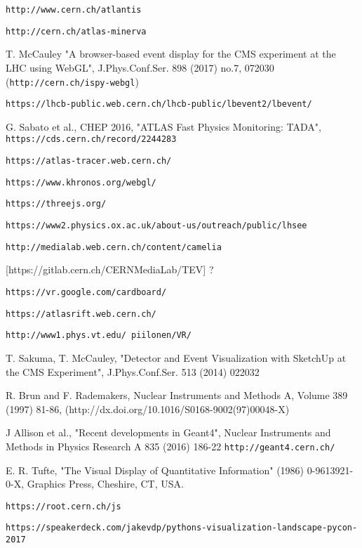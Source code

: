 \documentclass[12pt,a4paper]{article}
\begin{document}
\begin{thebibliography}{999}
 {\tt http://www.cern.ch/atlantis}

 {\tt http://cern.ch/atlas-minerva}

 T. McCauley "A browser-based event display for the CMS experiment at the LHC using WebGL", J.Phys.Conf.Ser. 898 (2017) no.7, 072030
  ({\tt http://cern.ch/ispy-webgl})

 {\tt https://lhcb-public.web.cern.ch/lhcb-public/lbevent2/lbevent/}

 G. Sabato et al., CHEP 2016, "ATLAS Fast Physics Monitoring: TADA",  {\tt https://cds.cern.ch/record/2244283}

 {\tt https://atlas-tracer.web.cern.ch/}

 {\tt https://www.khronos.org/webgl/}

 {\tt https://threejs.org/}

 {\tt https://www2.physics.ox.ac.uk/about-us/outreach/public/lhsee}

 {\tt http://medialab.web.cern.ch/content/camelia}

 [https://gitlab.cern.ch/CERNMediaLab/TEV] ?

 {\tt https://vr.google.com/cardboard/}

 {\tt https://atlasrift.web.cern.ch/}

 {\tt http://www1.phys.vt.edu/~piilonen/VR/}

 T. Sakuma, T. McCauley, "Detector and Event Visualization with SketchUp at the CMS Experiment", J.Phys.Conf.Ser. 513 (2014) 022032

 R. Brun and F. Rademakers, Nuclear Instruments and Methods A, Volume 389 (1997) 81-86, (http://dx.doi.org/10.1016/S0168-9002(97)00048-X)

 J Allison et al., "Recent developments in Geant4", Nuclear Instruments and Methods in Physics Research A 835 (2016) 186-22
  {\tt http://geant4.cern.ch/}

 E. R. Tufte, "The Visual Display of Quantitative Information" (1986) 0-9613921-0-X, Graphics Press, Cheshire, CT, USA.

 {\tt https://root.cern.ch/js}

 {\tt https://speakerdeck.com/jakevdp/pythons-visualization-landscape-pycon-2017}


\end{thebibliography}
\end{document}
